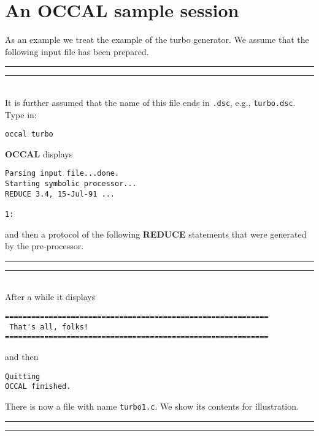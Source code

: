 \documentclass[12pt,a4paper]{article}
\newcommand{\OCCAL}{{\sf\bf OCCAL}}
\newcommand{\REDUCE}{{\sf\bf REDUCE}}
\newlength{\dummy}
\begin{document}
\newpage

\appendix

\renewcommand{\thesection}{Appendix~\Alph{section}}
\renewcommand{\thesubsection}{\Alph{section}.\arabic{subsection}}

\section[\protect\hspace*{\dummy}An \OCCAL{} sample session\protect\hspace*{-\dummy}]%
        {An \OCCAL{} sample session}

\label{app-turbo}
As an example we treat the example of the turbo generator. We assume
that the following input file has been prepared.\\
\rule{\textwidth}{0.6mm}
\begin{small}
  
\end{small}
\rule{\textwidth}{0.6mm}\\[3mm]
It is further assumed that the name of this file ends in
\verb|.dsc|, e.g., \verb|turbo.dsc|.
Type in:
\begin{verbatim}
occal turbo
\end{verbatim}
\OCCAL{} displays
\begin{verbatim}
Parsing input file...done.
Starting symbolic processor...
REDUCE 3.4, 15-Jul-91 ...

1:

\end{verbatim}
and then a protocol of the following \REDUCE{} statements that were
generated by the pre-processor.\\
\rule{\textwidth}{0.6mm}
\begin{small}
  
\end{small}
\rule{\textwidth}{0.6mm}\\[3mm]
After a while it displays
\begin{verbatim}
============================================================
 That's all, folks!
============================================================
\end{verbatim}
and then
\begin{verbatim}
Quitting
OCCAL finished.
\end{verbatim}
There is now a file with name \verb|turbo1.c|. We show its contents for illustration.\\
\rule{\textwidth}{0.6mm}
\begin{small}
  
\end{small}
\rule{\textwidth}{0.6mm}
\end{document}
